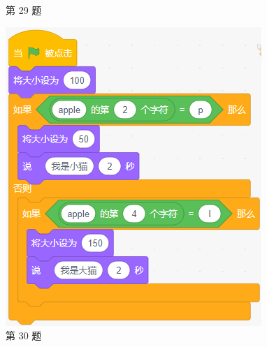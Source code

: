 \documentclass[10pt, a4paper]{article}
\begin{document}
\begin{enumerate}
\begin{figure}[htbp]
\begin{minipage}[t]{.35\textwidth}
\begin{minipage}[t]{.45\textwidth}
                \end{minipage}
                \caption*{第 29 题}
            \end{minipage}
            \begin{minipage}[t]{.18\textwidth}
                \centering
                \includegraphics[width=\textwidth]{figure/30.png}
                \caption*{第 30 题}
            \end{minipage}
            \begin{minipage}[t]{.19\textwidth}
                \centering

\end{minipage}
\end{figure}
\end{enumerate}
\end{document}
